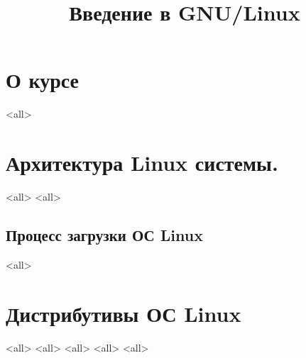

\title{Введение в GNU/Linux}





\begin{frame}
	\frametitle{}
	\titlepage
	\vspace{-0.5cm}
	\begin{center}
	\end{center}
\end{frame}


\begin{frame}
	\tableofcontents
	[hideallsubsections]
\end{frame}


\section{О курсе}

\mode<all>{}

\section{Архитектура Linux системы.}

\mode<all>{}
\mode<all>{}
\subsection{Процесс загрузки ОС Linux}
\mode<all>{}

\section{Дистрибутивы ОС Linux}
\mode<all>{}
\mode<all>{}
\mode<all>{}
\mode<all>{}
\mode<all>{}


